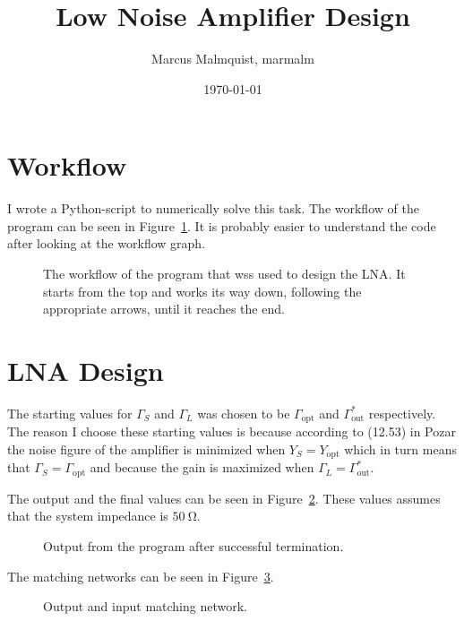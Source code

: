 \documentclass[12pt,a4paper]{article}
\title{Low Noise Amplifier Design}
\author{Marcus Malmquist, marmalm}
\date{\today}
\begin{document}
\maketitle

\section{Workflow}\label{sec:wf}
I wrote a Python-script to numerically solve this task. The workflow of the program can be seen in Figure~\ref{fig:workflow}. It is probably easier to understand the code after looking at the workflow graph.
\begin{figure}[h]
  \centering
  \noindent\makebox[\textwidth]{\scalebox{0.7}{}}
  \caption{The workflow of the program that wss used to design the LNA. It starts from the top and works its way down, following the appropriate arrows, until it reaches the end.}
  \label{fig:workflow}
\end{figure}

\section{LNA Design}
The starting values for $\Gamma_S$ and $\Gamma_L$ was chosen to be $\Gamma_\text{opt}$ and $\Gamma^*_\text{out}$ respectively. The reason I choose these starting values is because according to (12.53) in Pozar the noise figure of the amplifier is minimized when $Y_S=Y_\text{opt}$ which in turn means that $\Gamma_S=\Gamma_\text{opt}$ and because the gain is maximized when $\Gamma_L=\Gamma^*_\text{out}$.

The output and the final values can be seen in Figure~\ref{fig:result}. These values assumes that the system impedance is $\SI{50}{\ohm}$.
\begin{figure}[h]
  \centering
  \noindent{}
  \caption{Output from the program after successful termination.}
  \label{fig:result}
\end{figure}

The matching networks can be seen in Figure~\ref{fig:mnt}.
\begin{figure}[h]
  \centering
  \noindent\makebox[\textwidth]{\scalebox{0.7}{}}
  \caption{Output and input matching network.}
  \label{fig:mnt}
\end{figure}
\end{document}
